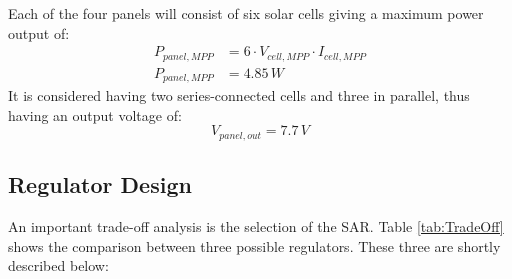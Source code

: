 %
Each of the four panels will consist of six solar cells giving a maximum power output of:
%
\begin{equation}
\begin{split}
P_{panel,MPP}&=6\cdot V_{cell,MPP}\cdot I_{cell,MPP}\\
P_{panel,MPP}&=4.85\,W
\end{split}
\end{equation}
%
It is considered having two series-connected cells and three in parallel, thus having an output voltage of: 
%
\begin{equation}
V_{panel,out}=7.7\,V
\end{equation}
%

%
\subsection{Regulator Design}
%
%
An important trade-off analysis is the selection of the \ac{SAR}. Table \ref{tab:TradeOff} shows the comparison between three possible regulators. These three are shortly described below:
%
